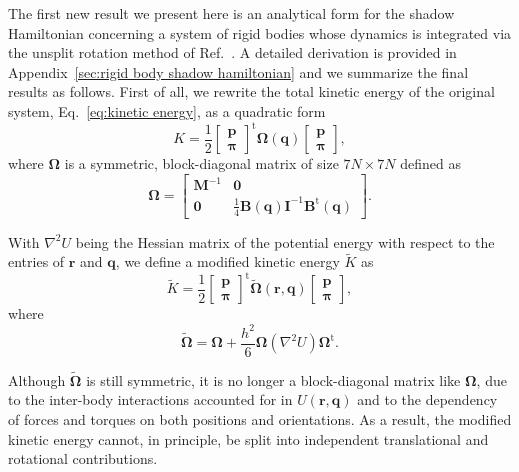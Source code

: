 \documentclass[
journal=jctcce,
layout=twocolumn
]{achemso}
\newcommand{\mt}[1]{\boldsymbol{\mathbf{#1}}}   %
\newcommand{\vt}[1]{\boldsymbol{\mathbf{#1}}}   %
\newcommand{\tr}[1]{#1^\text{t}}                %
\newcommand{\timestep}{h}
\newcommand{\modified}[1]{\widetilde{#1}}
\begin{document}
The first new result we present here is an analytical form for the shadow Hamiltonian concerning a system of rigid bodies whose dynamics is integrated via the unsplit rotation method of Ref.~. A detailed derivation is provided in Appendix~\ref{sec:rigid body shadow hamiltonian} and we summarize the final results as follows. First of all, we rewrite the total kinetic energy of the original system, Eq.~\eqref{eq:kinetic energy}, as a quadratic form
\begin{equation*}
K = \frac{1}{2} \tr{ \left[\begin{array}{c} \vt p \\ \vt \pi \end{array}\right]} {\mt \Omega}(\vt q) \left[\begin{array}{c} \vt p \\ \vt \pi \end{array}\right],
\end{equation*}
where $\mt \Omega$ is a symmetric, block-diagonal matrix of size $7N \times 7N$ defined as
\begin{equation*}
{\mt \Omega} = \left[\begin{array}{cc}
{\mt M}^{-1} & \mt 0 \\
\mt 0 & \frac{1}{4} {\mt B}(\vt q) {\mt I}^{-1} \tr{\mt B}(\vt q)
\end{array}\right].
\end{equation*}

With $\nabla^2 U$ being the Hessian matrix of the potential energy with respect to the entries of $\vt r$ and $\vt q$, we define a modified kinetic energy $\modified K$ as
\begin{equation*}
\modified K = \frac{1}{2} \tr{ \left[\begin{array}{c} \vt p \\ \vt \pi \end{array}\right]} \modified{\mathbf \Omega}(\vt r, \vt q) \left[\begin{array}{c} \vt p \\ \vt \pi \end{array}\right],
\end{equation*}
where
\begin{equation*}
\modified{\mathbf \Omega} = {\mt \Omega} + \frac{\timestep^2}{6} {\mt \Omega} (\nabla^2 U) \tr{\mt \Omega}.
\end{equation*}

Although $\modified{\mathbf \Omega}$ is still symmetric, it is no longer a block-diagonal matrix like $\mt \Omega$, due to the inter-body interactions accounted for in $U(\vt r, \vt q)$ and to the dependency of forces and torques on both positions and orientations. As a result, the modified kinetic energy cannot, in principle, be split into independent translational and rotational contributions.
\end{document}
